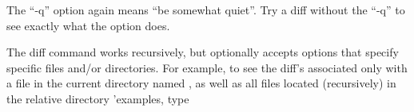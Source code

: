 \documentclass[12pt,strict]{TrilinosDevGuide}
\begin{document}
\begin{itemize}

The ``-q'' option again means ``be somewhat quiet''.  Try a diff without the 
``-q'' to see exactly what the option does.  

The diff command works recursively, but optionally accepts options that 
specify specific files and/or directories.  For example, to see the diff's 
associated only with a file in the current directory named 
, as well as all files located (recursively) in the 
relative directory \InlineDirectory'{examples}, type




\end{itemize}

\end{document}
